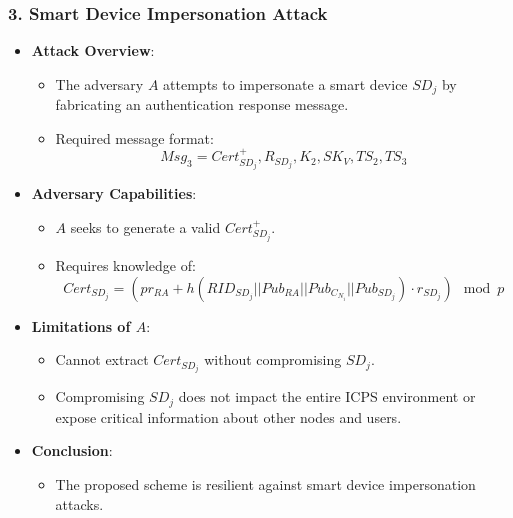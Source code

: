 \documentclass[9pt,handout]{beamer}
\begin{document}
\begin{frame}
    \frametitle{3. Smart Device Impersonation Attack}
    \begin{itemize}
        \item \textbf{Attack Overview}:
            \begin{itemize}
                \item The adversary \( A \) attempts to impersonate a smart device \( SD_j \) by fabricating an authentication response message.
                \item Required message format:
                \[
                Msg_3 = Cert^{+}_{SD_j}, R_{SD_j}, K_2, SK_V, TS_2, TS_3
                \]
            \end{itemize}
        \item \textbf{Adversary Capabilities}:
            \begin{itemize}
                \item \( A \) seeks to generate a valid \( Cert^{+}_{SD_j} \).
                \item Requires knowledge of:
                \[
                Cert_{SD_j} = (pr_{RA} + h(RID_{SD_j} || Pub_{RA} || Pub_{C_{N_i}} || Pub_{SD_j}) \cdot r_{SD_j}) \mod p
                \]
            \end{itemize}
        \item \textbf{Limitations of \( A \)}:
            \begin{itemize}
                \item Cannot extract \( Cert_{SD_j} \) without compromising \( SD_j \).
                \item Compromising \( SD_j \) does not impact the entire ICPS environment or expose critical information about other nodes and users.
            \end{itemize}
        \item \textbf{Conclusion}:
            \begin{itemize}
                \item The proposed scheme is resilient against smart device impersonation attacks.
            \end{itemize}
    \end{itemize}
\end{frame}
\end{document}
